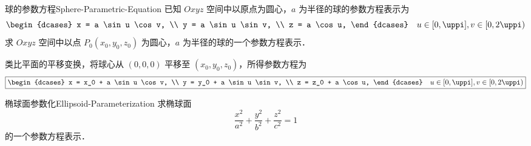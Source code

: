 \begin{problem}{球的参数方程}{Sphere-Parametric-Equation}
    已知 $Oxyz$ 空间中以原点为圆心，$a$ 为半径的球的参数方程表示为
    \begin{equation}
        \begin{dcases}
            x = a \sin u \cos v, \\
            y = a \sin u \sin v, \\
            z = a \cos u,
        \end{dcases} \quad u \in [0, \uppi], v \in [0, 2\uppi)
    \end{equation}
    求 $Oxyz$ 空间中以点 $P_0(x_0, y_0, z_0)$ 为圆心，$a$ 为半径的球的一个参数方程表示．
\end{problem}

\begin{solution}
    类比平面的平移变换，将球心从 $(0, 0, 0)$ 平移至 $(x_0, y_0, z_0)$，所得参数方程为
    \begin{equation}
        \boxed{
        \begin{dcases}
            x = x_0 + a \sin u \cos v, \\
            y = y_0 + a \sin u \sin v, \\
            z = z_0 + a \cos u,
        \end{dcases} \quad u \in [0, \uppi], v \in [0, 2\uppi)
        }
    \end{equation}
\end{solution}


\begin{problem}{椭球面参数化}{Ellipsoid-Parameterization}
    求椭球面
    \begin{equation}
        \frac{x^2}{a^2} + \frac{y^2}{b^2} + \frac{z^2}{c^2} = 1
    \end{equation}
    的一个参数方程表示．
\end{problem}

